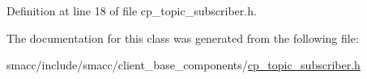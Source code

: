 Definition at line 18 of file cp\+\_\+topic\+\_\+subscriber.\+h.



The documentation for this class was generated from the following file\+:\begin{DoxyCompactItemize}
\item 
smacc/include/smacc/client\+\_\+base\+\_\+components/\hyperlink{cp__topic__subscriber_8h}{cp\+\_\+topic\+\_\+subscriber.\+h}\end{DoxyCompactItemize}
